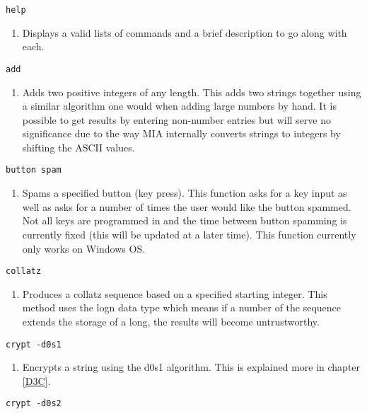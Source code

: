 \begin{lstlisting}
help
\end{lstlisting}
\begin{enumerate}
	\item[] Displays a valid lists of commands and a brief description to go along with each.
\end{enumerate}
\begin{lstlisting} 
add   
\end{lstlisting}
\begin{enumerate}
	\item[] Adds two positive integers of any length. This adds two strings together using a similar algorithm one would when adding large numbers by hand. It is possible to get results by entering non-number entries but will serve no significance due to the way MIA internally converts strings to integers by shifting the ASCII values.
\end{enumerate}
\begin{lstlisting} 
button spam
\end{lstlisting}
\begin{enumerate}
	\item[] Spams a specified button (key press). This function asks for a key input as well as asks for a number of times the user would like the button spammed. Not all keys are programmed in and the time between button spamming is currently fixed (this will be updated at a later time). This function currently only works on Windows OS.
\end{enumerate}
\begin{lstlisting} 
collatz   
\end{lstlisting}
\begin{enumerate}
	\item[] Produces a collatz sequence based on a specified starting integer. This method uses the logn data type which means if a number of the sequence extends the storage of a long, the results will become untrustworthy. 
\end{enumerate}
\begin{lstlisting} 
crypt -d0s1   
\end{lstlisting}
\begin{enumerate}
	\item[] Encrypts a string using the d0s1 algorithm. This is explained more in chapter \ref{D3C}.
\end{enumerate}
\begin{lstlisting} 
crypt -d0s2  
\end{lstlisting}
